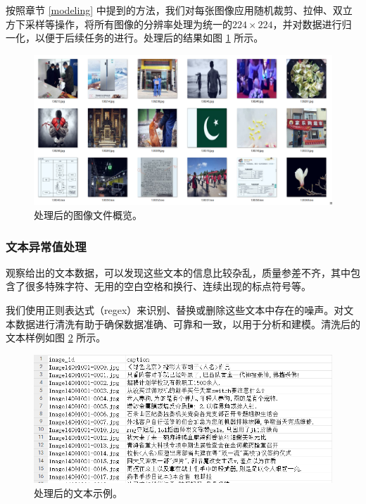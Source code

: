 \documentclass[a4paper]{zreport}
\begin{document}
按照章节 \ref{modeling} 中提到的方法，我们对每张图像应用随机裁剪、拉伸、双立方下采样等操作，将所有图像的分辨率处理为统一的$224 \times 224$，并对数据进行归一化，以便于后续任务的进行。处理后的结果如图 \ref{fig:cleanimage} 所示。

\begin{figure}[h]
\centering
\includegraphics[width=0.95\linewidth]{figures/clean_image}
\caption{处理后的图像文件概览。}
\label{fig:cleanimage}
\end{figure}

\subsubsection{文本异常值处理}

观察给出的文本数据，可以发现这些文本的信息比较杂乱，质量参差不齐，其中包含了很多特殊字符、无用的空白空格和换行、连续出现的标点符号等。

我们使用正则表达式（regex）来识别、替换或删除这些文本中存在的噪声。对文本数据进行清洗有助于确保数据准确、可靠和一致，以用于分析和建模。清洗后的文本样例如图 \ref{fig:cleantext} 所示。

\begin{figure}[h]
\centering
\includegraphics[width=0.95\linewidth]{figures/clean_text}
\caption{处理后的文本示例。}
\label{fig:cleantext}
\end{figure}
\end{document}
